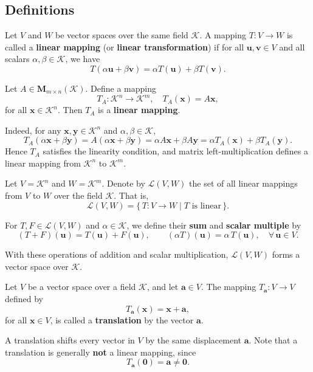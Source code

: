 \documentclass{ctexart}
\begin{document}
	\subsection{Definitions}
	\begin{mydef}
		Let $V$ and $W$ be vector spaces over the same field $\mathcal{K}$.  
		A mapping $T : V \to W$ is called a \textbf{linear mapping} (or \textbf{linear transformation}) if for all 
		$\mathbf{u}, \mathbf{v} \in V$ and all scalars $\alpha, \beta \in \mathcal{K}$, we have
		\[
		T(\alpha \mathbf{u} + \beta \mathbf{v})
		= \alpha T(\mathbf{u}) + \beta T(\mathbf{v}).
		\]
	\end{mydef}
	
	\begin{myex}
		Let $A \in \mathbf{M}_{m \times n}(\mathcal{K})$.  
		Define a mapping
		\[
		T_A : \mathcal{K}^n \to \mathcal{K}^m, \quad
		T_A(\mathbf{x}) = A\mathbf{x},
		\]
		for all $\mathbf{x} \in \mathcal{K}^n$.  
		Then $T_A$ is a \textbf{linear mapping}.  
		
		Indeed, for any $\mathbf{x}, \mathbf{y} \in \mathcal{K}^n$ and $\alpha, \beta \in \mathcal{K}$,
		\[
		T_A(\alpha \mathbf{x} + \beta \mathbf{y})
		= A(\alpha \mathbf{x} + \beta \mathbf{y})
		= \alpha A\mathbf{x} + \beta A\mathbf{y}
		= \alpha T_A(\mathbf{x}) + \beta T_A(\mathbf{y}).
		\]
		Hence $T_A$ satisfies the linearity condition,  
		and matrix left-multiplication defines a linear mapping from $\mathcal{K}^n$ to $\mathcal{K}^m$.
	\end{myex}
	
	\begin{myex}
		Let $V = \mathcal{K}^n$ and $W = \mathcal{K}^m$.  
		Denote by $\mathcal{L}(V, W)$ the set of all linear mappings from $V$ to $W$ over the field $\mathcal{K}$.  
		That is,
		\[
		\mathcal{L}(V, W)
		= \{\, T : V \to W \mid T \text{ is linear} \,\}.
		\]
		
		For $T, F \in \mathcal{L}(V, W)$ and $\alpha \in \mathcal{K}$,  
		we define their \textbf{sum} and \textbf{scalar multiple} by
		\[
		(T + F)(\mathbf{u}) = T(\mathbf{u}) + F(\mathbf{u}), 
		\qquad
		(\alpha T)(\mathbf{u}) = \alpha\, T(\mathbf{u}),
		\quad \forall\, \mathbf{u} \in V.
		\]
		
		With these operations of addition and scalar multiplication,  
		$\mathcal{L}(V, W)$ forms a vector space over $\mathcal{K}$.
	\end{myex}
	
	
	\begin{mydef}
		Let $V$ be a vector space over a field $\mathcal{K}$, and let $\mathbf{a} \in V$.  
		The mapping $T_{\mathbf{a}} : V \to V$ defined by
		\[
		T_{\mathbf{a}}(\mathbf{x}) = \mathbf{x} + \mathbf{a},
		\]
		for all $\mathbf{x} \in V$, is called a \textbf{translation} by the vector $\mathbf{a}$.
		
		A translation shifts every vector in $V$ by the same displacement $\mathbf{a}$.  
		Note that a translation is generally \textbf{not} a linear mapping, since
		\[
		T_{\mathbf{a}}(\mathbf{0}) = \mathbf{a} \neq \mathbf{0}.
		\]
	\end{mydef}
	
\end{document}
